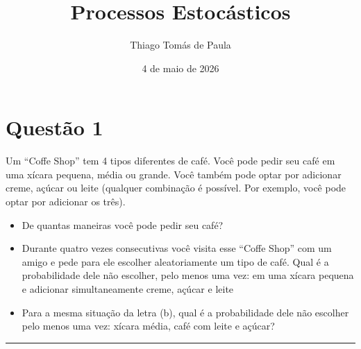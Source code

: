 \documentclass{article}
\title{Processos Estocásticos}
\author{Thiago Tomás de Paula}
\date{4 de maio de 2026}
\begin{document}
\maketitle

\section*{\sffamily Questão 1}
Um ``Coffe Shop'' tem 4 tipos diferentes de café. Você pode pedir seu café em uma xícara
pequena, média ou grande. Você também pode optar por adicionar creme, açúcar ou leite (qualquer
combinação é possível. Por exemplo, você pode optar por adicionar os três). 

\begin{itemize}
    \item [a)] 
    De quantas maneiras você pode pedir seu café?
    
    \item [b)] 
    Durante quatro vezes consecutivas você visita esse “Coffe Shop” com um amigo e pede para ele escolher aleatoriamente um tipo de café. Qual é a probabilidade dele não escolher, pelo menos uma vez: em uma xícara pequena e adicionar simultaneamente creme, açúcar e leite

    \item [c)]
    Para a mesma situação da letra (b), qual é a probabilidade dele não escolher pelo menos uma vez: xícara média, café com leite e açúcar?
\end{itemize}
\rule{\linewidth}{0.5pt}
\end{document}
